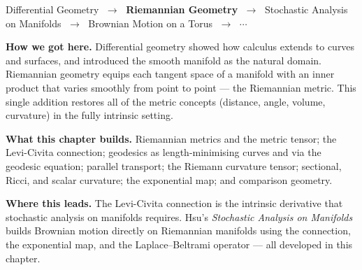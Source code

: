 
\begin{tcolorbox}[
  colback=gray!6,
  colframe=gray!40,
  arc=2pt,
  left=8pt, right=8pt, top=6pt, bottom=6pt,
  title={\small\textbf{Where You Are in the Journey}},
  fonttitle=\small\bfseries
]
\begin{center}
\small
Differential Geometry
$\;\to\;$ \textbf{Riemannian Geometry}
$\;\to\;$ Stochastic Analysis on Manifolds
$\;\to\;$ Brownian Motion on a Torus
$\;\to\;$ $\cdots$
\end{center}

\medskip
\noindent\textbf{How we got here.}
Differential geometry showed how calculus extends to curves and
surfaces, and introduced the smooth manifold as the natural
domain.
Riemannian geometry equips each tangent space of a manifold
with an inner product that varies smoothly from point to point ---
the Riemannian metric.
This single addition restores all of the metric concepts
(distance, angle, volume, curvature) in the fully intrinsic setting.

\medskip
\noindent\textbf{What this chapter builds.}
Riemannian metrics and the metric tensor; the Levi-Civita
connection; geodesics as length-minimising curves and via the
geodesic equation; parallel transport; the Riemann curvature
tensor; sectional, Ricci, and scalar curvature; the
exponential map; and comparison geometry.

\medskip
\noindent\textbf{Where this leads.}
The Levi-Civita connection is the intrinsic derivative that
stochastic analysis on manifolds requires.
Hsu's \textit{Stochastic Analysis on Manifolds} builds
Brownian motion directly on Riemannian manifolds using the
connection, the exponential map, and the Laplace--Beltrami
operator --- all developed in this chapter.
\end{tcolorbox}
\vspace{1em}

